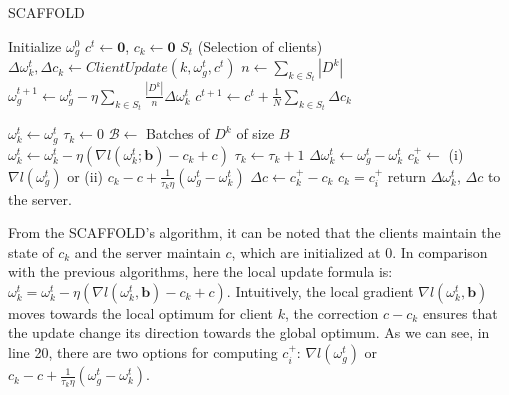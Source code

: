 \begin{algorithm}[H]
  \label{alg:SCAFFOLD}
  \caption{SCAFFOLD}
  \begin{algorithmic}[1]
    \Statex
    \State Initialize $\omega_g^0$
    \State $c^t \gets \mathbf{0}$, $c_k \gets \mathbf{0}$
      \State $S_t$  (Selection of clients)
        \State $\Delta \omega_k^{t}, \Delta c_k \gets ClientUpdate(k, \omega_g^t, c^t)$
      \EndFor
      \State $n \gets \sum_{k \in S_t} |D^k|$
      \State $\omega_g^{t+1} \gets \omega_g^t - \eta \sum_{k \in S_t} \frac{|D^k|}{n} \Delta \omega_k^t$
      \State $c^{t+1} \gets c^t + \frac{1}{N} \sum_{k \in S_t} \Delta c_k$
    \EndFor
    \EndProcedure

    \State $\omega_k^t \gets \omega_g^t$
    \State $\tau_k \gets 0$
    \State $\mathcal{B} \gets$ Batches of $D^k$ of size $B$
        \State $\omega_k^t \gets \omega_k^t - \eta (\nabla l(\omega_k^t; \mathbf{b}) - c_k + c)$
        \State $\tau_k \gets \tau_k + 1$
      \EndFor
    \EndFor
    \State $\Delta \omega_k^t \gets \omega_g^t - \omega_k^t$
    \State $c_k^+ \gets $ (i) $\nabla l(\omega_g^t)$ or (ii) $c_k - c + \frac{1}{\tau_k \eta} (\omega_g^t - \omega_k^t)$
    \State $\Delta c \gets c_k^+ - c_k$
    \State $c_k = c_i^+$
    \State return $\Delta \omega_k^t$, $\Delta c$  to the server.
    \EndProcedure
  \end{algorithmic}
\end{algorithm}

From the SCAFFOLD's algorithm, it can be noted that the clients maintain the state of $c_k$ and the server maintain $c$, which are initialized at 0.
In comparison with the previous algorithms, here the local update formula is: $\omega_k^t = \omega_k^t - \eta (\nabla l (\omega_k^t, \mathbf{b}) - c_k + c)$. Intuitively, the local gradient $\nabla l (\omega_k^t, \mathbf{b})$ moves towards the local optimum for client $k$, the correction $c - c_k$ ensures that the update change its direction towards the global optimum.
As we can see, in line 20, there are two options for computing $c_i^+$: $\nabla l(\omega_g^t)$ or $c_k - c + \frac{1}{\tau_k \eta} (\omega_g^t - \omega_k^t)$.

